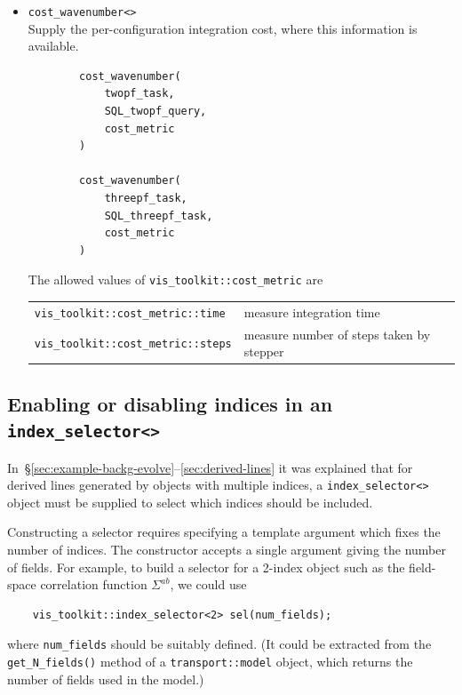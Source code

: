 \documentclass[11pt,a4paper]{article}
\begin{document}
\begin{itemize}
    \item \texttt{cost_wavenumber<>} \\
    Supply the per-configuration integration cost, where this information is
    available.
    \begin{verbatim}
        cost_wavenumber(
            twopf_task,    
            SQL_twopf_query,
            cost_metric
        )
        
        cost_wavenumber(
            threepf_task,
            SQL_threepf_task,
            cost_metric
        )
    \end{verbatim}
    The allowed values of \texttt{vis_toolkit::cost_metric}
    are \\
    \begin{tabular}{p{6cm}p{8.5cm}}
        \texttt{vis_toolkit::cost_metric::time} &
            measure integration time \\
        \texttt{vis_toolkit::cost_metric::steps} &
            measure number of steps taken by stepper
    \end{tabular}

\end{itemize}

\subsection{Enabling or disabling indices in an \texttt{index_selector<>}}
\label{sec:index-selector}

In~\S\ref{sec:example-backg-evolve}--\ref{sec:derived-lines}
it was explained that
for derived lines generated by objects with multiple indices, a
\texttt{index_selector<>} object must be supplied
to select which indices should be included.

Constructing a selector requires specifying a template argument which fixes the
number of indices.
The constructor accepts a single argument giving the number
of fields.
For example, to build a selector for a 2-index object such as the field-space
correlation function $\Sigma^{ab}$, we could use
\begin{verbatim}
	vis_toolkit::index_selector<2> sel(num_fields);
\end{verbatim}
where \texttt{num_fields} should be suitably defined.
(It could be extracted from the \texttt{get_N_fields()} method of a
\texttt{transport::model} object, which returns the number of
fields used in the model.)
\end{document}
